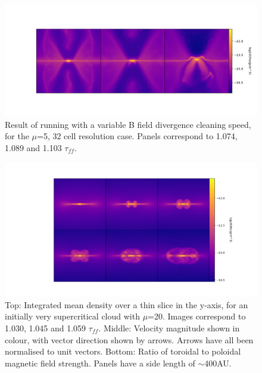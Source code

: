 \documentclass[11pt]{article}
\begin{document}
\begin{figure}[h!]
         \centering
		\includegraphics[width=18cm]{explosion.png}
		\caption{Result of running with a variable B field divergence cleaning speed, for the $\mu$=5, 32 cell resolution case. Panels correspond to 1.074, 1.089 and 1.103 $\tau_{ff}$.}
		\label{fig:explode}
\end{figure}


\begin{figure}[h!]
         \centering
		\includegraphics[width=18cm]{burzle.png}
		\caption{Top: Integrated mean density over a thin slice in the y-axis, for an initially very supercritical cloud with $\mu$=20. Images correspond to 1.030, 1.045 and 1.059 $\tau_{ff}$. Middle: Velocity magnitude shown in colour, with vector direction shown by arrows. Arrows have all been normalised to unit vectors. Bottom: Ratio of toroidal to poloidal magnetic field strength. Panels have a side length of $\sim$400AU.}
		\label{fig:burzle}
\end{figure}
\end{document}
